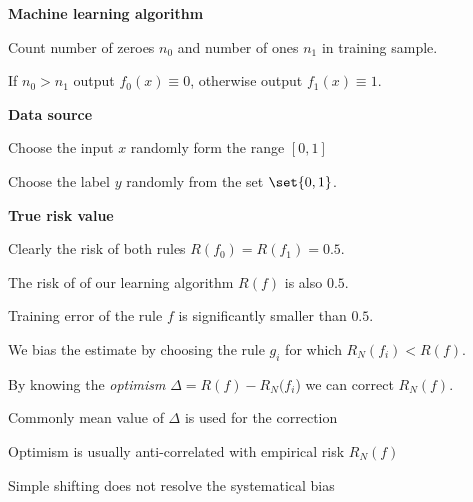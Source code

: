 \documentclass[landscape,footrule]{foils}
\begin{document}

\textbf{Machine learning algorithm}
\begin{triangles}
\item Count number of zeroes $n_0$ and number of ones $n_1$ in training sample.
\item If $n_0>n_1$ output $f_0(x)\equiv 0$, otherwise output $f_1(x)\equiv 1$.
\end{triangles}
\vspace*{1cm}

\textbf{Data source}
\begin{triangles}
\item Choose the input $x$ randomly form the range $[0,1]$
\item Choose the label $y$ randomly from the set $\set{0,1}$.
\end{triangles}

\vspace*{1cm}
\textbf{True risk value}
\begin{triangles}
\item Clearly the risk of both rules $R(f_0)=R(f_1)=0.5$.
\item The risk of of our learning algorithm $R(f)$ is also $0.5$. 
\end{triangles}



\vspace*{-0.5cm}

Training error of the rule $f$ is significantly smaller than $0.5$.
\begin{triangles}
\item We bias the estimate by choosing the rule $g_i$ for which $R_N(f_i) < R(f)$.
\end{triangles}


\vspace*{-0.5cm}
By knowing the \emph{optimism} $\Delta=R(f)-R_N(f_i$) we can correct $R_N(f)$.   
\begin{triangles}
\item Commonly mean value of $\Delta$ is used for the correction 
\end{triangles}



\vspace*{-0.5cm}
Optimism is usually anti-correlated with empirical risk $R_N(f)$   
\begin{triangles}
\item Simple shifting does not resolve the systematical bias  
\end{triangles}
\end{document}

